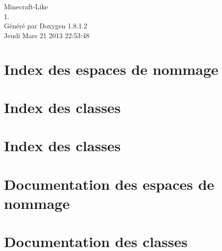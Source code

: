 \documentclass{book}
\begin{document}
\hypersetup{pageanchor=false,citecolor=blue}
\begin{titlepage}
\vspace*{7cm}
\begin{center}
{\Large Minecraft-\/\-Like \\[1ex]\large 1. }\\
\vspace*{1cm}
{\large Généré par Doxygen 1.8.1.2}\\
\vspace*{0.5cm}
{\small Jeudi Mars 21 2013 22:53:48}\\
\end{center}
\end{titlepage}
\clearemptydoublepage
{}
\tableofcontents
\clearemptydoublepage
{}
\hypersetup{pageanchor=true,citecolor=blue}
\chapter{Index des espaces de nommage}

\chapter{Index des classes}

\chapter{Index des classes}

\chapter{Documentation des espaces de nommage}

\chapter{Documentation des classes}

















\printindex
\end{document}
